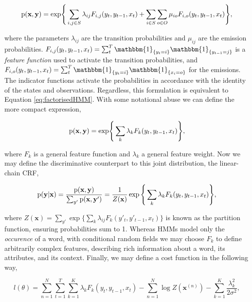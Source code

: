 \begin{equation}
\text{p}(\textbf{x}, \textbf{y}) = \text{exp} \Bigg\{
\sum_{i, j \in S}{
\lambda_{ij}F_{i,j}(y_t, y_{t-1}, x_t)
}
+
\sum_{i \in S}\sum_{o \in O}{
\mu_{io}F_{i,o}(y_t, y_{t-1}, x_t)
}
\Bigg\},
\label{eq:jointcrf}
\end{equation}

where the parameters $\lambda_{ij}$ are the transition probabilities and $\mu_{ij}$ are the emission probabilities. $F_{i,j}(y_t, y_{t-1}, x_t) = \sum_t^T\mathbbm{1}_{\{y_t = i\}}\mathbbm{1}_{\{y_{t-1} = j\}}$ is a \emph{feature function} used to activate the transition probabilities, and $F_{i,o}(y_t, y_{t-1}, x_t) = \sum_t^T\mathbbm{1}_{\{y_t = i\}}\mathbbm{1}_{\{x_{i} = o\}}$ for the emissions. The indicator functions activate the probabilities in accordance with the identity of the states and observations. Regardless, this formulation is equivalent to Equation \ref{eq:factorisedHMM}. With some notational abuse we can define the more compact expression,

\begin{equation}
\text{p}(\textbf{x}, \textbf{y}) = \text{exp} \Bigg\{\sum_k{
\lambda_{k}F_{k}(y_t, y_{t-1}, x_t)
}\Bigg\},
\label{eq:jointcrfcompact}
\end{equation}

where $F_k$ is a general feature function and $\lambda_k$ a general feature weight. Now we may define the discriminative counterpart to this joint distribution, the linear-chain CRF,

\begin{equation}
\text{p}(\textbf{y}|\textbf{x}) = \frac{\text{p}(\textbf{x}, \textbf{y})}{\sum_{y'}{\text{p}(\textbf{x}, \textbf{y}')}} = \frac{1}{Z(\mathbf{x})}\exp \Bigg\{\sum_k{
\lambda_{k}F_{k}(y_t, y_{t-1}, x_t)
}\Bigg\},
\end{equation}

where $Z(\mathbf{x}) = \sum_{y'}\exp \Big\{\sum_k{\lambda_{ij}F_{k}(y'_t, y'_{t-1}, x_t)}\Big\}$ is known as the partition function, ensuring probabilities sum to 1. Whereas HMMs model only the \emph{occurence} of a word, with conditional random fields we may choose $F_k$ to define arbitrarily complex features, describing rich information about a word, its attributes, and its context. Finally, we may define a cost function in the following way,

\begin{equation}
l(\theta) = \sum_{n=1}^N\sum_{t=1}^T\sum_{k=1}^K\lambda_kF_{k}(y_t, y_{t-1}, x_t) - \sum_{n=1}^N\log Z(\mathbf{x}^{(n)}) - \sum_{k=1}^K \frac{\lambda_k^2}{2\sigma^2},
\end{equation}

